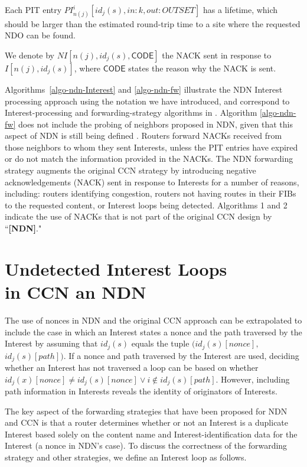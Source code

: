 \documentclass{ancs15-alternate}
\begin{document}
Each PIT entry $PI^i_{n(j)}[ id_j(s), in:k, out:OUTSET ]$ has a lifetime,
which should be larger than the estimated round-trip time to a site where the requested NDO can be found.

We denote by $NI[n(j), id_j(s), \mathsf{CODE}]$ the NACK sent in response to  $I[n(j), id_j(s) ]$, where $\mathsf{CODE}$ states the reason why the NACK is sent. 

Algorithms~\ref{algo-ndn-Interest}  and \ref{algo-ndn-fw} illustrate the NDN Interest processing  approach \cite{ndn-fw, ndn-fw2} using the notation we have introduced, and  correspond to Interest-processing and forwarding-strategy algorithms in \cite{ndn-fw2}. Algorithm \ref{algo-ndn-fw} does not include the probing of neighbors proposed in NDN, given that this aspect of  NDN is  still being defined \cite{ndn-fw2}. Routers forward NACKs received from those neighbors to whom they sent Interests, unless the PIT entries have expired or do not match the information provided in the NACKs. 
The NDN forwarding strategy augments  the original CCN strategy by  introducing  negative acknowledgements (NACK) sent in 
response to Interests for a number of reasons, including:  routers identifying
congestion, routers not having routes in their FIBs to the requested content, or Interest loops being detected.
Algorithms 1 and 2 indicate the use of NACKs that is not  part of the original CCN design by ``{\bf [NDN]}."


\section{Undetected Interest Loops \\ in CCN an NDN  }
\label{sec-loop}

 The use of nonces in NDN and the original CCN approach can be extrapolated  to include the case in which 
an Interest states a nonce and the path traversed by the Interest by assuming that $ id_j(s)$ equals the tuple $( id_j(s)[nonce], $ $id_j(s)[path] )$.
If a nonce and path traversed by the Interest are used, deciding whether an Interest has not traversed a loop can be based on whether $ id_j(x)[nonce] \not= id_j(s)[nonce] \vee i \not\in id_j(s)[path]$. However, including path information in Interests reveals the identity of originators of Interests.

The key aspect of the  forwarding strategies that have been proposed  for NDN and CCN is that  a router determines whether or not an Interest is  a duplicate Interest  based solely on the content name and Interest-identification data for the Interest (a nonce in NDN's case).  To discuss  the correctness of the  forwarding strategy and other strategies,  we define an Interest loop as follows.
\end{document}
